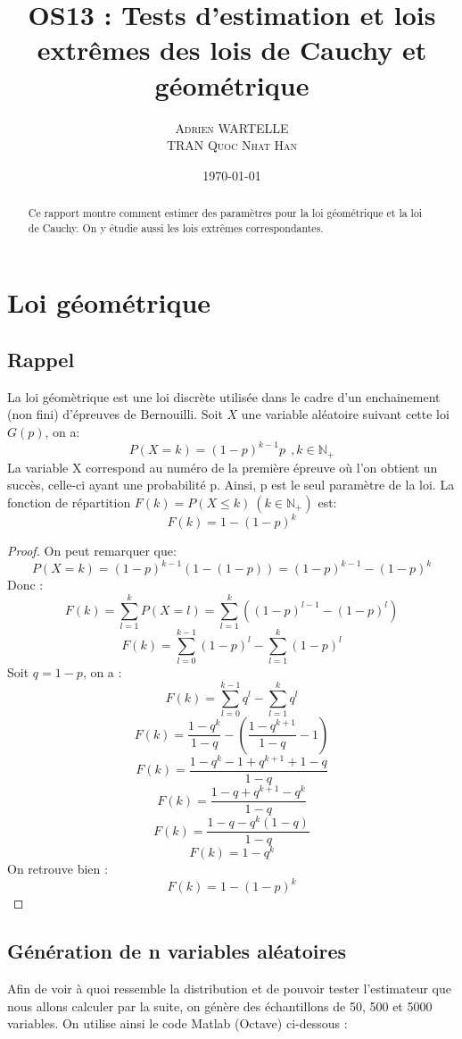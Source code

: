 \documentclass[12pt,a4paper,titlepage]{article}
\title{OS13 : Tests d'estimation et lois extrêmes des lois de Cauchy et géométrique}
\author{\textsc{Adrien WARTELLE} \\ \textsc{TRAN Quoc Nhat Han}}
\date{\today}
\numberwithin{equation}{section}
\begin{document}
\maketitle 
\renewcommand{\contentsname}{Sommaire}
\tableofcontents

\clearpage

\begin{abstract}
Ce rapport montre comment estimer des paramètres pour la loi géométrique et la loi de Cauchy.
On y étudie aussi les lois extrêmes correspondantes.
\end{abstract}

\section{Loi géométrique}

\subsection{Rappel}

La loi géomètrique est une loi discrète utilisée
dans le cadre d'un enchainement (non fini) d'épreuves de Bernouilli. Soit
$X$ une variable aléatoire suivant cette loi $G(p)$, on a:
\[P(X=k) = (1-p)^{k-1}p\ \ ,k\in\mathbb{N}_{+}\]
La variable X correspond au numéro de la première épreuve où l'on obtient un succès, celle-ci ayant une probabilité p. Ainsi, p est le seul paramètre de la loi.
La fonction de répartition $F(k) = P(X\leq{}k)\ (k\in\mathbb{N}_{+})$ est:
\[F(k)=1-(1-p)^{k}\]
\begin{proof}
On peut remarquer que:
\[P(X=k)=(1-p)^{k-1}(1-(1-p))=(1-p)^{k-1}-(1-p)^{k}\]
Donc :
\[F(k)=\sum\limits_{l=1}^{k}P(X=l)=\sum\limits_{l=1}^{k}((1-p)^{l-1}-(1-p)^{l})\]
\[F(k)=\sum\limits_{l=0}^{k-1}(1-p)^{l}-\sum\limits_{l=1}^{k}(1-p)^{l}\]
Soit $q=1-p$, on a :
\[F(k)=\sum\limits_{l=0}^{k-1}q^{l}-\sum\limits_{l=1}^{k}q^{l}\]
\[F(k)=\frac{1-q^k}{1-q}-(\frac{1-q^{k+1}}{1-q}-1)\]
\[F(k)=\frac{1-q^k-1+q^{k+1}+1-q}{1-q}\]
\[F(k)=\frac{1-q+q^{k+1}-q^k}{1-q}\]
\[F(k)=\frac{1-q-q^k(1-q)}{1-q}\]
\[F(k)=1-q^k\]
On retrouve bien :
\[F(k)=1-(1-p)^k\]
\end{proof}

\subsection{Génération de n variables aléatoires}

Afin de voir à quoi ressemble la distribution et de pouvoir tester l'estimateur que
nous allons calculer par la suite, on génère des échantillons de 50, 500 et 5000 variables.
On utilise ainsi le code Matlab (Octave) ci-dessous :
\end{document}
